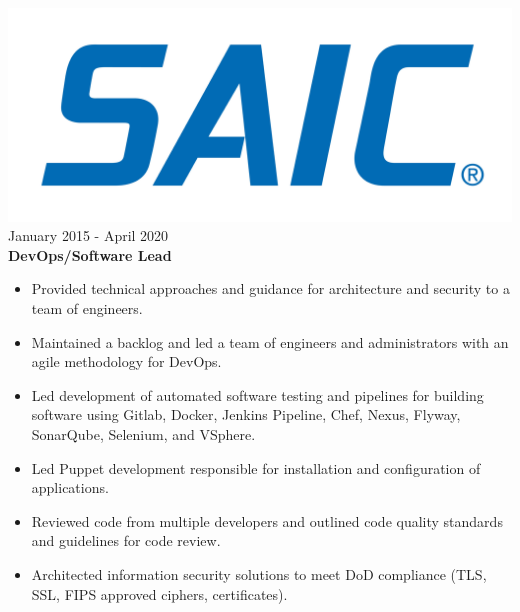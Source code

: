 \documentclass[12pt, line, margin]{res}
\begin{document}
\begin{resume}
{\sl  \includegraphics[scale=0.015, trim=110 200 110 120]{resume_images/SAIC_logo_RGB-lg.jpg}} \hfill January 2015 - April 2020 \\
                \textbf{DevOps/Software Lead} 
                 \begin{itemize}  \itemsep -2pt %
	      \item   Provided technical approaches and guidance for architecture \newline
                                and security to a team of engineers.
                 \item   Maintained a backlog and led a team of engineers and \newline
                             administrators with an agile methodology for DevOps.
	      \item   Led development of automated software testing and pipelines \newline
                               for building software using Gitlab, Docker, Jenkins Pipeline, Chef, 
                               Nexus, Flyway, SonarQube, Selenium, and VSphere.
                 \item  Led Puppet development responsible for installation and \newline
                               configuration of applications.
               \item  Reviewed code from multiple developers and outlined code quality \newline
                               standards and guidelines for code review.
	      \item   Architected information security solutions to meet DoD \newline
                              compliance (TLS, SSL, FIPS approved ciphers, certificates).
                \end{itemize}
                

\end{resume}
\end{document}
